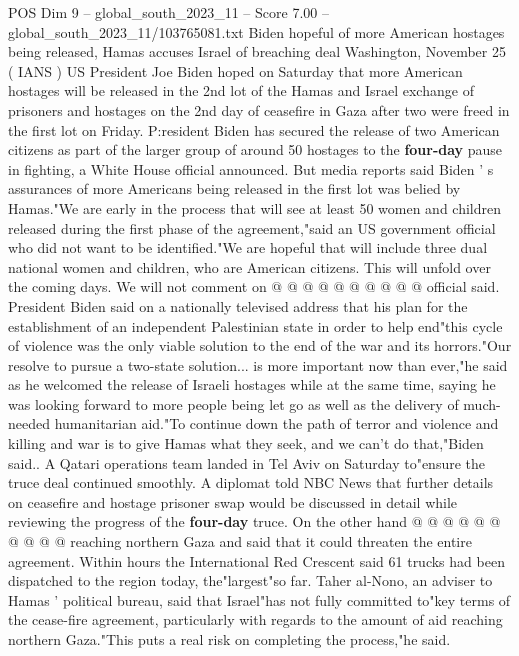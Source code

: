 \begin{textsample}{POS Dim 9 – global\_south\_2023\_11 – Score 7.00 – global\_south\_2023\_11/103765081.txt}  \label{ex:f9_pos_023}
Biden hopeful of more American hostages being released, Hamas accuses Israel of breaching deal Washington, November 25 ( IANS ) US President Joe Biden hoped on Saturday that more American hostages will be released in the 2nd lot of the Hamas and Israel exchange of prisoners and hostages on the 2nd day of ceasefire in Gaza after two were freed in the first lot on Friday.
P:resident Biden has secured the release of two American citizens as part of the larger group of around 50 hostages to the \textbf{four-day} pause in fighting, a White House official announced.
But media reports said Biden ' s assurances of more Americans being released in the first lot was belied by Hamas."We are early in the process that will see at least 50 women and children released during the first phase of the agreement,"said an US government official who did not want to be identified."We are hopeful that will include three dual national women and children, who are American citizens.
This will unfold over the coming days.
We will not comment on @ @ @ @ @ @ @ @ @ @ official said.
President Biden said on a nationally televised address that his plan for the establishment of an independent Palestinian state in order to help end"this cycle of violence was the only viable solution to the end of the war and its horrors."Our resolve to pursue a two-state solution... is more important now than ever,"he said as he welcomed the release of Israeli hostages while at the same time, saying he was looking forward to more people being let go as well as the delivery of much-needed humanitarian aid."To continue down the path of terror and violence and killing and war is to give Hamas what they seek, and we can't do that,"Biden said..
A Qatari operations team landed in Tel Aviv on Saturday to"ensure the truce deal continued smoothly.
A diplomat told NBC News that further details on ceasefire and hostage prisoner swap would be discussed in detail while reviewing the progress of the \textbf{four-day} truce.
On the other hand @ @ @ @ @ @ @ @ @ @ reaching northern Gaza and said that it could threaten the entire agreement.
Within hours the International Red Crescent said 61 trucks had been dispatched to the region today, the"largest"so far.
Taher al-Nono, an adviser to Hamas ' political bureau, said that Israel"has not fully committed to"key terms of the cease-fire agreement, particularly with regards to the amount of aid reaching northern Gaza."This puts a real risk on completing the process,"he said.

\end{textsample}
